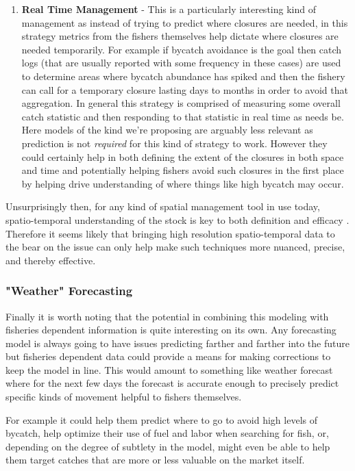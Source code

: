 \documentclass[11pt]{article}
\begin{document}
\begin{enumerate}
\item \textbf{Real Time Management} - This is a particularly interesting kind of management as instead of trying to predict where closures are needed, in this strategy metrics from the fishers themselves help dictate where closures are needed temporarily. For example if bycatch avoidance is the goal then catch logs (that are usually reported with some frequency in these cases) are used to determine areas where bycatch abundance has spiked and then the fishery can call for a temporary closure lasting days to months in order to avoid that aggregation. In general this strategy is comprised of measuring some overall catch statistic and then responding to that statistic in real time as needs be. Here models of the kind we're proposing are arguably less relevant as prediction is not \textit{required} for this kind of strategy to work. However they could certainly help in both defining the extent of the closures in both space and time and potentially helping fishers avoid such closures in the first place by helping drive understanding of where things like high bycatch may occur. 
\end{enumerate}

Unsurprisingly then, for any kind of spatial management tool in use today, spatio-temporal understanding of the stock is key to both definition and efficacy \citep{selig2016} \citep{little2014}. Therefore it seems likely that bringing high resolution spatio-temporal data to the bear on the issue can only help make such techniques more nuanced, precise, and thereby effective. 

\subsubsection{"Weather" Forecasting}

Finally it is worth noting that the potential in combining this modeling with fisheries dependent information is quite interesting on its own. Any forecasting model is always going to have issues predicting farther and farther into the future but fisheries dependent data could provide a means for making corrections to keep the model in line. This would amount to something like weather forecast where for the next few days the forecast is accurate enough to precisely predict specific kinds of movement helpful to fishers themselves. 

For example it could help them predict where to go to avoid high levels of bycatch, help optimize their use of fuel and labor when searching for fish, or, depending on the degree of subtlety in the model, might even be able to help them target catches that are more or less valuable on the market itself. 
\end{document}
